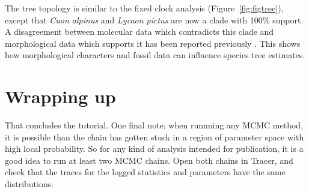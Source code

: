 \documentclass[12pt]{article}
\begin{document}
The tree topology is similar to the fixed clock analysis
(Figure~\ref{fig:figtree}), except that \textit{Cuon alpinus} and
\textit{Lycaon pictus} are now a clade with 100\% support. A disagreement
between molecular data which contradicts this clade and morphological
data which supports it has been reported previously \citep{Zrzavy2004}. This shows
how morphological characters and fossil data can influence species tree
estimates.

\section{Wrapping up}

That concludes the tutorial. One final note; when runnning any MCMC method, it
is possible than the chain has gotten stuck in a region of parameter space
with high local probability. So for any kind of analysis intended for
publication, it is a good idea to run at least two MCMC chains. Open both
chains in Tracer, and check that the traces for the logged statistics and
parameters have the same distributions.



\end{document}

